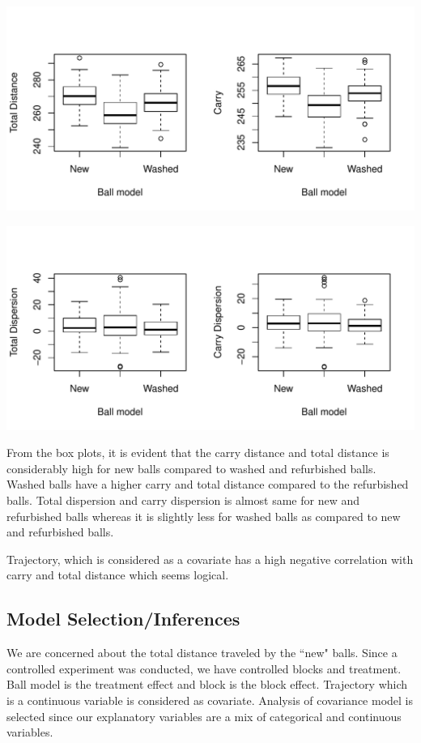 \documentclass{article}\usepackage[]{graphicx}\usepackage[]{color}
\makeatletter
\def\maxwidth{ %
  \ifdim\Gin@nat@width>\linewidth
    \linewidth
  \else
    \Gin@nat@width
  \fi
}
\newenvironment{knitrout}{}{} %
\makeatother
\begin{document}
\begin{knitrout}
\color{fgcolor}
\includegraphics[width=\maxwidth]{figure/box_plots_distance-1} 

\end{knitrout}

\begin{knitrout}
\color{fgcolor}
\includegraphics[width=\maxwidth]{figure/box_plots_disp-1} 

\end{knitrout}
From the box plots, it is evident that the carry distance and total distance is considerably high for new balls compared to washed and refurbished balls. Washed balls have a higher carry and total distance compared to the refurbished balls. Total dispersion and carry dispersion is almost same for new and refurbished balls whereas it is slightly less for washed balls as compared to new and refurbished balls.

Trajectory, which is considered as a covariate has a high negative correlation with carry and total distance which seems logical.

\subsection*{Model Selection/Inferences}
We are concerned about the total distance traveled by the ``new" balls. Since a controlled experiment was conducted, we have controlled blocks and treatment. Ball model is the treatment effect and block is the block effect. Trajectory which is a continuous variable is considered as covariate. Analysis of covariance model is selected since our explanatory variables are a mix of categorical and continuous variables.
\end{document}
